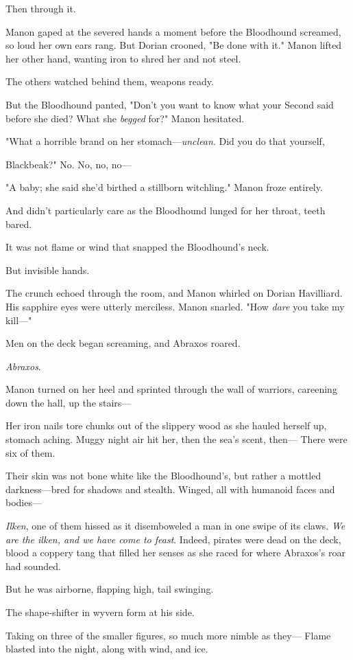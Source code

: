 Then through it.

Manon gaped at the severed hands a moment before the Bloodhound screamed, so loud her own ears rang. But Dorian crooned, "Be done with it." Manon lifted her other hand, wanting iron to shred her and not steel.

The others watched behind them, weapons ready.

But the Bloodhound panted, "Don't you want to know what your Second said before she died? What she \emph{begged} for?" Manon hesitated.

"What a horrible brand on her stomach---\emph{unclean}. Did you do that yourself,

Blackbeak?" No. No, no, no---

"A baby; she said she'd birthed a stillborn witchling." Manon froze entirely.

And didn't particularly care as the Bloodhound lunged for her throat, teeth bared.

It was not flame or wind that snapped the Bloodhound's neck.

But invisible hands.

The crunch echoed through the room, and Manon whirled on Dorian Havilliard. His sapphire eyes were utterly merciless. Manon snarled. "How \emph{dare} you take my kill---"

Men on the deck began screaming, and Abraxos roared.

\emph{Abraxos}.

Manon turned on her heel and sprinted through the wall of warriors, careening down the hall, up the stairs---

Her iron nails tore chunks out of the slippery wood as she hauled herself up, stomach aching. Muggy night air hit her, then the sea's scent, then--- There were six of them.

Their skin was not bone white like the Bloodhound's, but rather a mottled darkness---bred for shadows and stealth. Winged, all with humanoid faces and bodies---

\emph{Ilken}, one of them hissed as it disemboweled a man in one swipe of its claws. \emph{We are the ilken, and we have come to feast}. Indeed, pirates were dead on the deck, blood a coppery tang that filled her senses as she raced for where Abraxos's roar had sounded.

But he was airborne, flapping high, tail swinging.

The shape-shifter in wyvern form at his side.

Taking on three of the smaller figures, so much more nimble as they--- Flame blasted into the night, along with wind, and ice.

